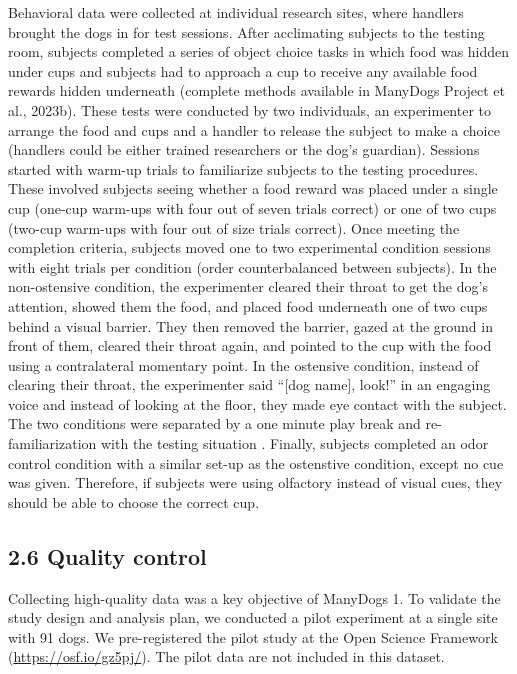 \documentclass[
  man,floatsintext]{apa6}
\begin{document}
Behavioral data were collected at individual research sites, where handlers brought the dogs in for test sessions. After acclimating subjects to the testing room, subjects completed a series of object choice tasks in which food was hidden under cups and subjects had to approach a cup to receive any available food rewards hidden underneath (complete methods available in ManyDogs Project et al., 2023b). These tests were conducted by two individuals, an experimenter to arrange the food and cups and a handler to release the subject to make a choice (handlers could be either trained researchers or the dog's guardian). Sessions started with warm-up trials to familiarize subjects to the testing procedures. These involved subjects seeing whether a food reward was placed under a single cup (one-cup warm-ups with four out of seven trials correct) or one of two cups (two-cup warm-ups with four out of size trials correct). Once meeting the completion criteria, subjects moved one to two experimental condition sessions with eight trials per condition (order counterbalanced between subjects). In the non-ostensive condition, the experimenter cleared their throat to get the dog's attention, showed them the food, and placed food underneath one of two cups behind a visual barrier. They then removed the barrier, gazed at the ground in front of them, cleared their throat again, and pointed to the cup with the food using a contralateral momentary point. In the ostensive condition, instead of clearing their throat, the experimenter said ``{[}dog name{]}, look!'' in an engaging voice and instead of looking at the floor, they made eye contact with the subject. The two conditions were separated by a one minute play break and re-familiarization with the testing situation . Finally, subjects completed an odor control condition with a similar set-up as the ostenstive condition, except no cue was given. Therefore, if subjects were using olfactory instead of visual cues, they should be able to choose the correct cup.

\hypertarget{quality-control}{%
\subsection{2.6 Quality control}\label{quality-control}}

Collecting high-quality data was a key objective of ManyDogs 1. To validate the study design and analysis plan, we conducted a pilot experiment at a single site with 91 dogs. We pre-registered the pilot study at the Open Science Framework (\url{https://osf.io/gz5pj/}). The pilot data are not included in this dataset.
\end{document}
